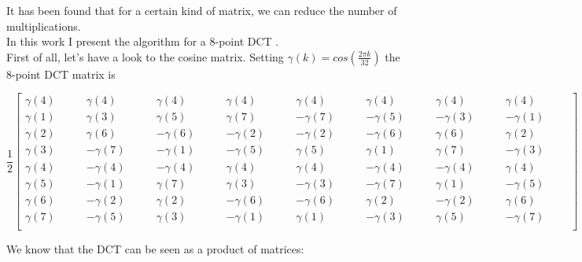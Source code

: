      It has been found that for a certain kind of matrix, we can reduce the number of multiplications.\\
     In this work I present the algorithm for a 8-point DCT \cite{dct1}.\\
     First of all, let's have a look to the cosine matrix.
     Setting $ \gamma(k)=cos(\frac{2\pi k}{32}) $ the 8-point DCT matrix is
     \bigskip
     
     \begin{center}	
     	$ \dfrac{1}{2}\begin{bmatrix} \gamma(4)  & \gamma(4) &\gamma(4)  & \gamma(4) &\gamma(4)  & \gamma(4) &\gamma(4)  & \gamma(4) \\
     	
     	\gamma(1)  & \gamma(3) &\gamma(5)  & \gamma(7) &-\gamma(7)\qquad  & -\gamma(5)\qquad &-\gamma(3) \qquad & -\gamma(1) \qquad      	\\
     	
    \gamma(2)  & \gamma(6) &-\gamma(6) \qquad & -\gamma(2) \qquad&-\gamma(2)  & -\gamma(6) &\gamma(6)  & \gamma(2)\\ 

\gamma(3)  & -\gamma(7) &-\gamma(1)  & -\gamma(5) &\gamma(5)  & \gamma(1) &\gamma(7)  & -\gamma(3)\\
 
\gamma(4)  & -\gamma(4) &-\gamma(4)  & \gamma(4) &\gamma(4)  & -\gamma(4) &-\gamma(4)  & \gamma(4)\\

\gamma(5)  & -\gamma(1) &\gamma(7)  & \gamma(3) &-\gamma(3)  & -\gamma(7) &\gamma(1)  & -\gamma(5)\\
     
\gamma(6)  & -\gamma(2) &\gamma(2)  & -\gamma(6) &-\gamma(6)  & \gamma(2) &-\gamma(2)  & \gamma(6)\\

\gamma(7) \qquad & -\gamma(5) \qquad&\gamma(3)  & -\gamma(1) &\gamma(1)  & -\gamma(3) &\gamma(5)  & -\gamma(7)\\   
      \end{bmatrix} $
     	
     \end{center}
     \bigskip
     We know that the DCT can be seen as a product of matrices:
     
